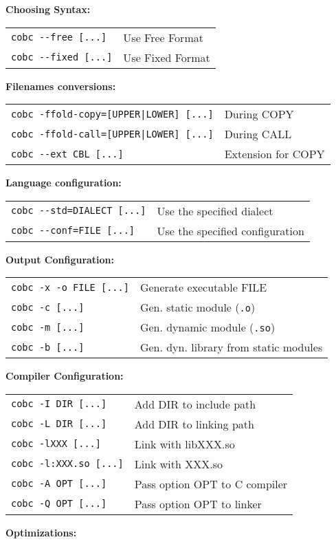 \documentclass[10pt,landscape]{article}
\begin{document}
\begin{multicols}{3}
{{\bf Choosing Syntax:}\\
\begin{tabular}{ll}
\verb+cobc --free [...]+ & Use Free Format \\
\verb+cobc --fixed [...]+ & Use Fixed Format \\
\end{tabular}

{\bf Filenames conversions:}\\
\begin{tabular}{ll}
\verb+cobc -ffold-copy=[UPPER|LOWER] [...]+ & During COPY \\
\verb+cobc -ffold-call=[UPPER|LOWER] [...]+ & During CALL \\
\verb+cobc --ext CBL [...]+ & Extension for COPY\\
\end{tabular}
{\bf Language configuration:}\\
\begin{tabular}{ll}
\verb+cobc --std=DIALECT [...]+ & Use the specified dialect \\
\verb+cobc --conf=FILE [...]+ & Use the specified configuration \\
\end{tabular}
{\bf Output Configuration:}\\
\begin{tabular}{ll}
\verb+cobc -x -o FILE [...]+ & Generate executable FILE \\
\verb+cobc -c [...]+ & Gen. static module (\verb+.o+) \\
\verb+cobc -m [...]+ & Gen. dynamic module (\verb+.so+) \\
\verb+cobc -b [...]+ & Gen. dyn. library from static modules \\
\end{tabular}
{\bf Compiler Configuration:}\\
\begin{tabular}{ll}
\verb+cobc -I DIR [...]+ & Add DIR to include path\\
\verb+cobc -L DIR [...]+ & Add DIR to linking path\\
\verb+cobc -lXXX [...]+ & Link with libXXX.so\\
\verb+cobc -l:XXX.so [...]+ & Link with XXX.so\\
\verb+cobc -A OPT [...]+ & Pass option OPT to C compiler\\
\verb+cobc -Q OPT [...]+ & Pass option OPT to linker\\
\end{tabular}
{\bf Optimizations:}\\
}
\end{multicols}
\end{document}
